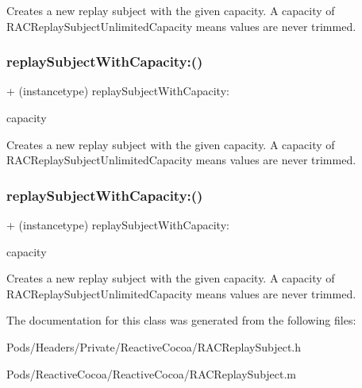 Creates a new replay subject with the given capacity. A capacity of R\+A\+C\+Replay\+Subject\+Unlimited\+Capacity means values are never trimmed. \mbox{\label{interface_r_a_c_replay_subject_a785aef992cf7495c52c1bea97eadc2d3}} 
\subsubsection{\texorpdfstring{replay\+Subject\+With\+Capacity\+:()}{replaySubjectWithCapacity:()}\hspace{0.1cm}{\footnotesize\ttfamily [2/3]}}
{\footnotesize\ttfamily + (instancetype) replay\+Subject\+With\+Capacity\+: \begin{DoxyParamCaption}\item[{(N\+S\+U\+Integer)}]{capacity }\end{DoxyParamCaption}}

Creates a new replay subject with the given capacity. A capacity of R\+A\+C\+Replay\+Subject\+Unlimited\+Capacity means values are never trimmed. \mbox{\label{interface_r_a_c_replay_subject_a785aef992cf7495c52c1bea97eadc2d3}} 
\subsubsection{\texorpdfstring{replay\+Subject\+With\+Capacity\+:()}{replaySubjectWithCapacity:()}\hspace{0.1cm}{\footnotesize\ttfamily [3/3]}}
{\footnotesize\ttfamily + (instancetype) replay\+Subject\+With\+Capacity\+: \begin{DoxyParamCaption}\item[{(N\+S\+U\+Integer)}]{capacity }\end{DoxyParamCaption}}

Creates a new replay subject with the given capacity. A capacity of R\+A\+C\+Replay\+Subject\+Unlimited\+Capacity means values are never trimmed. 

The documentation for this class was generated from the following files\+:\begin{DoxyCompactItemize}
\item 
Pods/\+Headers/\+Private/\+Reactive\+Cocoa/R\+A\+C\+Replay\+Subject.\+h\item 
Pods/\+Reactive\+Cocoa/\+Reactive\+Cocoa/R\+A\+C\+Replay\+Subject.\+m\end{DoxyCompactItemize}
